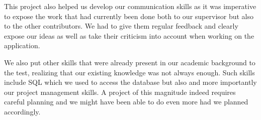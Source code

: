 \documentclass{eplmastersthesis}
\begin{document}
This project also helped us develop our communication skills as it was imperative to expose the work that had currently been done both to our supervisor but also to the other contributors. We had to give them regular feedback and clearly expose our ideas as well as take their criticism into account when working on the application.\\

\newpage

We also put other skills that were already present in our academic background to the test, realizing that our existing knowledge was not always enough. Such skills include SQL which we used to access the database but also and more importantly our project management skills. A project of this magnitude indeed requires careful planning and we might have been able to do even more had we planned accordingly.\\
\end{document}
